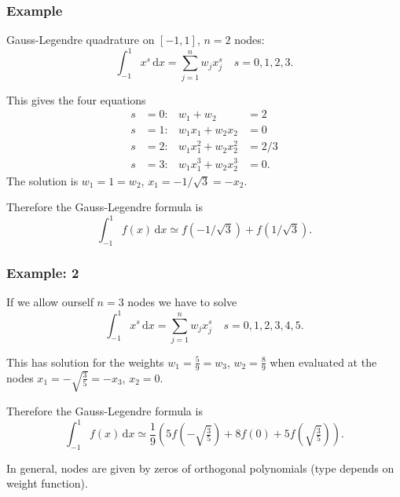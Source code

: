 \documentclass{beamer}
\begin{document}
\begin{frame}
  \frametitle{Example}

  Gauss-Legendre quadrature on $[-1,1]$, $n=2$ nodes:
  \begin{equation*}
    \int_{-1}^1 x^s \, \text{d}x = \sum_{j=1}^n w_j x_j^s \quad
     s = 0, 1, 2, 3.
  \end{equation*} \pause

  This gives the four equations
  \begin{align*}
  &&s & = 0 : & w_1 + w_2 & = 2 &&\\
  &&s & = 1 : & w_1 x_1 + w_2 x_2 & = 0 &&\\
  &&s & = 2 : & w_1 x_1^2 + w_2 x_2^2 & = 2 / 3 &&\\
  &&s & = 3 : & w_1 x_1^3 + w_2 x_2^3 & = 0.&&
  \end{align*}
  The solution is $w_1 = 1 = w_2$, $x_1 = - 1 / \sqrt{3} = -
  x_2$. \pause

  \vspace{1ex}

  Therefore the Gauss-Legendre formula is
  \begin{equation*}
    \int_{-1}^{1} f(x) \, \text{d}x \simeq f(-1 / \sqrt{3}) +  f(1 /
    \sqrt{3}).
  \end{equation*}

\end{frame}

\begin{frame}
  \frametitle{Example: 2}

  If we allow ourself $n=3$ nodes we have to solve
  \begin{equation*}
    \int_{-1}^1 x^s \, \text{d}x = \sum_{j=1}^n w_j x_j^s \quad
     s = 0, 1, 2, 3, 4, 5.
  \end{equation*} \pause

  This has solution for the weights $w_1 = \tfrac{5}{9} = w_3$, $w_2 =
  \tfrac{8}{9}$ when evaluated at the nodes $x_1 = -
  \sqrt{\tfrac{3}{5}} = - x_3$, $x_2 = 0$. \pause

  \vspace{1ex}

  Therefore the Gauss-Legendre formula is
  \begin{equation*}
    \int_{-1}^{1} f(x) \, \text{d}x \simeq \frac{1}{9} \left( 5
      f(-\sqrt{\tfrac{3}{5}}) + 8 f(0) + 5 f(\sqrt{\tfrac{3}{5}}) \right).
  \end{equation*} \pause

  \vspace{1ex}

  In general, nodes are given by zeros of orthogonal polynomials (type
  depends on weight function).

\end{frame}
\end{document}
